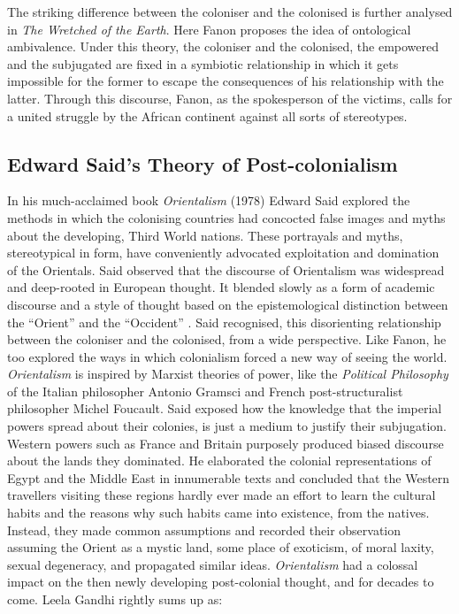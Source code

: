 The striking difference between the coloniser and the colonised is further analysed in \emph{The Wretched of the Earth}. Here Fanon proposes the idea of ontological ambivalence. Under this theory, the coloniser and the colonised, the empowered and the subjugated are fixed in a symbiotic relationship in which it gets impossible for the former to escape the consequences of his relationship with the latter. Through this discourse, Fanon, as the spokesperson of the victims, calls for a united struggle by the African continent against all sorts of stereotypes.

\subsection{Edward Said’s Theory of Post-colonialism}

In his much-acclaimed book \emph{Orientalism} (1978) Edward Said explored the methods in which the colonising countries had concocted false images and myths about the developing, Third World nations. These portrayals and myths, stereotypical in form, have conveniently advocated exploitation and domination of the Orientals. Said observed that the discourse of Orientalism was widespread and deep-rooted in European thought. It blended slowly as a form of academic discourse and a style of thought based on the epistemological distinction between the ``Orient'' and the ``Occident'' \parencite{Said1979}. Said recognised, this disorienting relationship between the coloniser and the colonised, from a wide perspective. Like Fanon, he too explored the ways in which colonialism forced a new way of seeing the world. \emph{Orientalism} is inspired by Marxist theories of power, like the \emph{Political Philosophy} of the Italian philosopher Antonio Gramsci and French post-structuralist philosopher Michel Foucault. Said exposed how the knowledge that the imperial powers spread about their colonies, is just a medium to justify their subjugation. Western powers such as France and Britain purposely produced biased discourse about the lands they dominated. He elaborated the colonial representations of Egypt and the Middle East in innumerable texts and concluded that the Western travellers visiting these regions hardly ever made an effort to learn the cultural habits and the reasons why such habits came into existence, from the natives. Instead, they made common assumptions and recorded their observation assuming the Orient as a mystic land, some place of exoticism, of moral laxity, sexual degeneracy, and propagated similar ideas. \emph{Orientalism} had a colossal impact on the then newly developing post-colonial thought, and for decades to come. Leela Gandhi rightly sums up as: 


